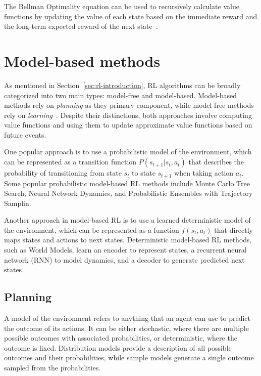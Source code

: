 \documentclass[../xlapes02]{subfiles}
\begin{document}
    The Bellman Optimality equation can be used to recursively calculate value functions by updating the value of each state based on the immediate reward and the long-term expected reward of the next state~\cite{rao2022foundations}.


    \section{Model-based methods}\label{sec:model-based-methods}
    As mentioned in Section~\cref{sec:rl-introduction}, RL algorithms can be broadly categorized into two main types: model-free and model-based. Model-based methods rely on \emph{planning} as they primary component, while model-free methods rely on \emph{learning}~\cite{sutton2018reinforcement}. Despite their distinctions, both approaches involve computing value functions and using them to update approximate value functions based on future events.

    One popular approach is to use a probabilistic model of the environment, which can be represented as a transition function $P(s_{t+1}|s_t, a_t)$ that describes the probability of transitioning from state $s_t$ to state $s_{t+1}$ when taking action $a_t$. Some popular probabilistic model-based RL methods include Monte Carlo Tree Search, Neural Network Dynamics, and Probabilistic Ensembles with Trajectory Samplin.

    Another approach in model-based RL is to use a learned deterministic model of the environment, which can be represented as a function $f(s_t, a_t)$ that directly maps states and actions to next states. Deterministic model-based RL methods, such as World Models, learn an encoder to represent states, a recurrent neural network (RNN) to model dynamics, and a decoder to generate predicted next states.

    \subsection{Planning}\label{subsec:planning}
    A model of the environment refers to anything that an agent can use to predict the outcome of its actions. It can be either stochastic, where there are multiple possible outcomes with associated probabilities, or deterministic, where the outcome is fixed. Distribution models provide a description of all possible outcomes and their probabilities, while sample models generate a single outcome sampled from the probabilities.
\end{document}
